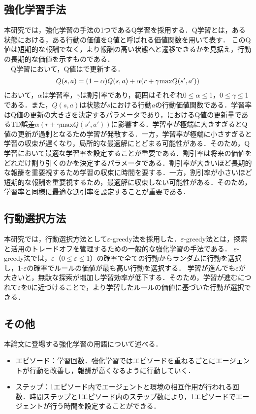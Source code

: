 \subsection{強化学習手法}
本研究では，強化学習の手法の1つであるQ学習\cite{watkins}を採用する．Q学習とは，ある状態における，ある行動の価値をQ値と呼ばれる価値関数を用いて表す．
このQ値は短期的な報酬でなく，より報酬の高い状態へと遷移できるかを見据え，行動の長期的な価値を示すものである．\\
　Q学習において，Q値はで更新する．\\
\begin{eqnarray}
  \equlabel{Q}
  Q(s,a)=(1-\alpha)Q(s,a)+\alpha(r+\gamma \mathrm{max}Q(s',a'))
\end{eqnarray}
において，$\alpha$は学習率，$\gamma$は割引率であり，範囲はそれぞれ0$\leq$$\alpha$$\leq$1，0$\leq$$\gamma$$\leq$1である．また，$Q(s,a)$は状態が$s$における行動$a$の行動価値関数である．学習率はQ値の更新の大きさを決定するパラメータであり，におけるQ値の更新量であるTD誤差$\alpha(r+\gamma \mathrm{max}Q(s',a'))$に影響する．学習率が極端に大きすぎるとQ値の更新が過剰となるため学習が発散する．一方，学習率が極端に小さすぎると学習の収束が遅くなり，局所的な最適解にとどまる可能性がある．そのため，Q学習において最適な学習率を設定することが重要である．割引率は将来の価値をどれだけ割り引くのかを決定するパラメータである．割引率が大きいほど長期的な報酬を重要視するため学習の収束に時間を要する．一方，割引率が小さいほど短期的な報酬を重要視するため，最適解に収束しない可能性がある．そのため，学習率と同様に最適な割引率を設定することが重要である．
\subsection{行動選択方法}
本研究では，行動選択方法として$\varepsilon$-greedy法\cite{greedy}を採用した．$\varepsilon$-greedy法とは，探索と活用のトレードオフを管理するための一般的な強化学習の手法である．
$\varepsilon$-greedy法では，$\varepsilon$（0$\leq$$\varepsilon$$\leq$1）の確率で全ての行動からランダムに行動を選択し，1-$\varepsilon$の確率でルールの価値が最も高い行動を選択する．
学習が進んでも$\varepsilon$が大きいと，無駄な探索が増加し学習効率が低下する．そのため，学習が進むにつれて$\varepsilon$を0に近づけることで，より学習したルールの価値に基づいた行動が選択できる．
\subsection{その他}
本論文に登場する強化学習の用語について述べる．\\
\begin{itemize}
  \item エピソード：学習回数．強化学習ではエピソードを重ねるごとにエージェントが行動を改善し，報酬が高くなるように行動していく．
  \item ステップ：1エピソード内でエージェントと環境の相互作用が行われる回数．時間ステップと1エピソード内のステップ数により，1エピソードでエージェントが行う時間を設定することができる．
\end{itemize}
